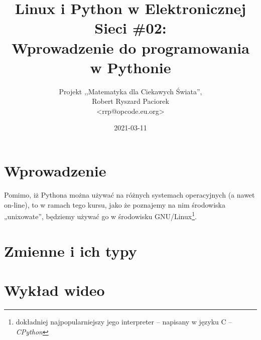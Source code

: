 \documentclass{pdfBooklets}
\title{Linux i Python w Elektronicznej Sieci \#02:\\ Wprowadzenie do programowania w Pythonie}
\author{%
	Projekt ,,Matematyka dla Ciekawych Świata'',\\
	Robert Ryszard Paciorek\\\normalsize\ttfamily <rrp@opcode.eu.org>
}
\date  {2021-03-11}
\begin{document}
\maketitle

\section{Wprowadzenie}



Pomimo, iż Pythona można używać na różnych systemach operacyjnych (a nawet on-line),
to w ramach tego kursu, jako że poznajemy na nim środowiska „unixowate”,
będziemy używać go w środowisku GNU/Linux\footnote{
	dokładniej najpopularniejszy jego interpreter – napisany w języku C – \textit{CPython}
}.






\section{Zmienne i ich typy}
	

\section{Wykład wideo}


\ZadaniaRozwiazaniaAuto[intro=booklets-sections/python/zadania-00-intro.tex]

\end{document}
